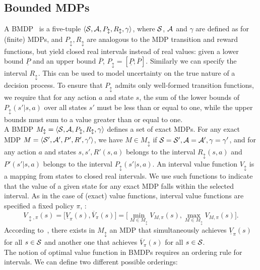 \subsection{Bounded \ac{MDPs}}
A \acf{BMDP}~\citep[]{givan2000bounded} is a five-tuple $\langle \mathcal{S}, \mathcal{A}, P_{\updownarrow}, R_{\updownarrow}, \gamma \rangle$, where $\mathcal{S}$, $\mathcal{A}$ and $\gamma$ are defined as for (finite) MDPs, and $P_{\updownarrow}, R_{\updownarrow}$ are analogous to the MDP transition and reward functions, but yield closed real intervals instead of real values: given a lower bound $\underline{P}$ and an upper bound $\overline{P}$, $P_{\updownarrow} = [\underline{P}; \overline{P}]$. Similarly we can specify the interval $R_{\updownarrow}$. This can be used to model uncertainty on the true nature of a decision process. To ensure that $P_{\updownarrow}$ admits only well-formed transition functions, we require that for any action $a$ and state $s$, the sum of the lower bounds of $P_{\updownarrow}(s'|s,a)$ over all states $s'$ must be less than or equal to one, while the upper bounds must sum to a value greater than or equal to one.\\
\newline
A BMDP $M_{\updownarrow} = \langle \mathcal{S}, \mathcal{A}, P_{\updownarrow}, R_{\updownarrow}, \gamma \rangle$ defines a set of exact MDPs. For any exact MDP $M = \langle \mathcal{S}', \mathcal{A}', P', R', \gamma' \rangle$, we have $M \in M_{\updownarrow}$ if $\mathcal{S} = \mathcal{S}', \mathcal{A} = \mathcal{A}', \gamma = \gamma'$, and for any action $a$ and states $s, s', R'(s,a)$ belongs to the interval $R_{\updownarrow}(s,a)$ and $P'(s'|s,a)$ belongs to the interval $P_{\updownarrow}(s'|s,a)$. An interval value function $V_{\updownarrow}$ is a mapping from states to closed real intervals. We use such functions to indicate that the value of a given state for any exact MDP falls within the selected interval. As in the case of (exact) value functions, interval value functions are specified \wrt a fixed policy $\pi$, \ie:
$$V_{\updownarrow, \pi}(s) = \Big[ \underline{V}_{\pi}(s), \overline{V}_{\pi}(s)\Big] = \Big[ \min_{M \in M_{\updownarrow}} V_{M,\pi}(s), \max_{M \in M_{\updownarrow}} V_{M,\pi}(s)\Big].$$
According to~\citep{givan2000bounded}, there exists in $M_{\updownarrow}$ an \ac{MDP} that simultaneously achieves $\underline{V}_{\pi}(s)$ for all $s \in \mathcal{S}$ and another one that achieves $\overline{V}_{\pi}(s)$ for all $s \in \mathcal{S}$.\\
\newline
The notion of optimal value function in \ac{BMDP}s requires an ordering rule for intervals. We can define two different possible orderings:
